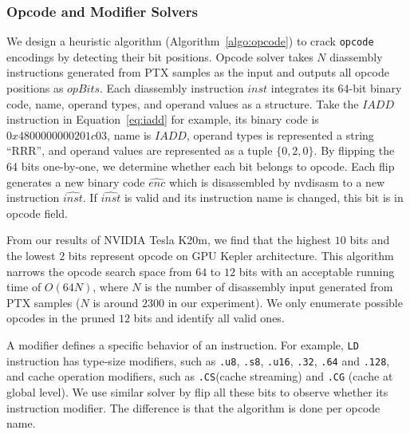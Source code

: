 \subsubsection{Opcode and Modifier Solvers}
We design a heuristic algorithm (Algorithm~\ref{algo:opcode}) to crack {\tt opcode} encodings by detecting their bit positions.
Opcode solver takes $N$ diassembly instructions generated from PTX samples as the input and outputs all opcode positions as $opBits$.
Each diassembly instruction $inst$ integrates its 64-bit binary code, name, operand types, and operand values as a structure.
Take the $IADD$ instruction in Equation~\ref{eq:iadd} for example, its binary code is $0x4800000000201c03$, name is $IADD$, operand types is represented a string ``RRR'', and operand values are represented as a tuple $\{ 0,2,0 \}$.
By flipping the 64 bits one-by-one, we determine whether each bit belongs to opcode.
Each flip generates a new binary code $\widehat{enc}$ which is disassembled by nvdisasm to a new instruction $\widehat{inst}$.
If $\widehat{inst}$ is valid and its instruction name is changed, this bit is in opcode field.


From our results of NVIDIA Tesla K20m, we find that the highest $10$ bits and the lowest $2$ bits represent opcode on GPU Kepler architecture.
This algorithm narrows the opcode search space from $64$ to $12$ bits with an acceptable running time of $O(64N)$, where $N$ is the number of disassembly input generated from PTX samples ($N$ is around $2300$ in our experiment). %
We only enumerate possible opcodes in the pruned $12$ bits and identify all valid ones.

A modifier defines a specific behavior of an instruction. 
For example, {\tt LD} instruction has type-size modifiers, such as {\tt .u8}, {\tt .s8}, {\tt .u16}, {\tt .32}, {\tt .64} and {\tt .128}, and cache operation modifiers, such as {\tt .CS}(cache streaming) and {\tt .CG} (cache at global level). 
We use similar solver by flip all these bits to observe whether its instruction
modifier. The difference is that the algorithm is done per opcode name.


